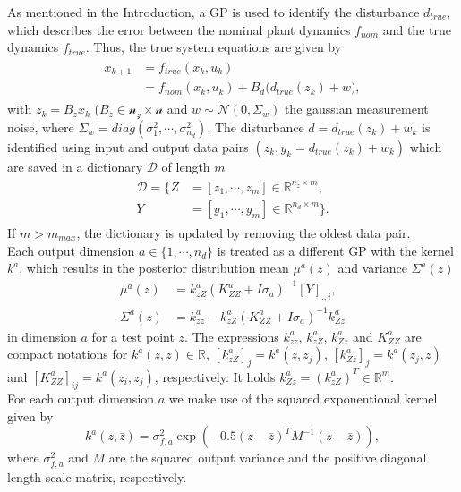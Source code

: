 \documentclass[letterpaper, 10 pt, conference]{ieeeconf}  %
\newcommand{\R}{\mathbb{R}}
\begin{document}
As mentioned in the Introduction, a GP is used to identify the disturbance $d_{true}$, which describes the error between the nominal plant dynamics $f_{nom}$ and the true dynamics $f_{true}$. Thus, the true system equations are given by
\begin{align}
\begin{split}
x_{k+1} &= f_{true}(x_k,u_k) \\
        &=  f_{nom}(x_k,u_k) + B_d\big(d_{true}(z_k)+ w\big),
\end{split}
\end{align}
with $z_k = B_z x_k$ ($B_z \in \mathcal{n_z \times n}$ and $w \sim \mathcal{N}(0,\Sigma_w)$  the gaussian measurement noise, where $\Sigma_w= diag(\sigma_1^2, \cdots ,\sigma_{n_d}^2)$.
The disturbance $d = d_{true}(z_k) + w_k$ is identified using input and output data pairs $(z_k,y_k=d_{true}(z_k)+w_k)$ which are saved in a dictionary $\mathcal{D}$ of length $m$
\begin{align}
\begin{split}
\mathcal{D} = \{Z &=[z_1, \cdots, z_m] \in \R^{n_z \times m} , \\
                Y &=[y_{1},\cdots,y_{m}]\in \R^{n_d \times m} \}.
\end{split}
\end{align}
If $m>m_{max}$, the dictionary is updated by removing the oldest data pair.\\
Each output dimension $a \in \{1, \cdots, n_d\}$ is treated as a different GP with the kernel $k^a$, which results in the posterior distribution mean $\mu^a(z)$ and variance $\Sigma^a(z)$
\begin{align}
\mu^a(z) &= k_{zZ}^a( K_{ZZ}^a +I \sigma_a)^{-1}[Y]_{.,i},\\
\Sigma^a(z) &= k_{zz}^a-k_{zZ}^a ( K_{ZZ}^a +I \sigma_a)^{-1} k_{Zz}^a
\end{align}
in dimension $a$ for a test point $z$.
The expressions $k_{zz}^a$, $ k_{zZ}^a$, $k_{Zz}^a$ and $K_{ZZ}^a$ are compact notations for $k^a(z,z) \in \R$, $[k_{zZ}^a]_j =k^a(z,z_j)$, $[k_{Zz}^a]_j =k^a(z_j,z)$ and $[K_{ZZ}^a]_{ij} = k^a(z_i,z_j)$, respectively. It holds $k_{Zz}^a=(k_{zZ}^a)^T \in \R^m$.\\
For each output dimension $a$ we make use of the squared exponentional kernel given by
\begin{equation}
k^a(z,\bar{z}) = \sigma_{f,a}^2 \exp(-0.5(z-\bar{z})^T M^{-1} (z-\bar{z})),
\end{equation}
where $\sigma_{f,a}^2$ and $M$ are the squared output variance and the positive diagonal length scale matrix, respectively.
\end{document}
